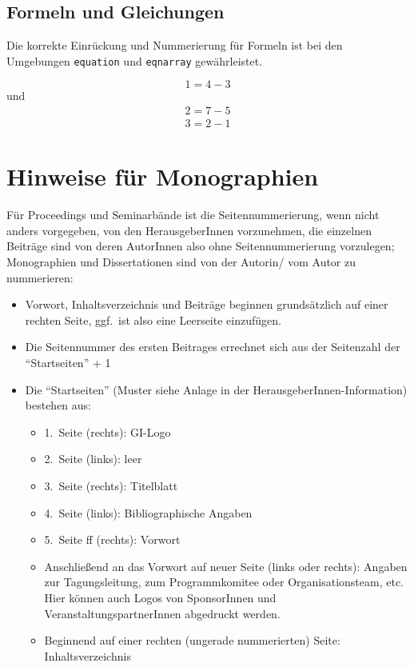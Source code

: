 \documentclass{lni}
\begin{document}
\subsection{Formeln und Gleichungen}

Die korrekte Einrückung und Nummerierung für Formeln ist bei den Umgebungen \texttt{equation} und \texttt{eqnarray} gewährleistet.

\begin{equation}
  1=4-3
\end{equation}
und
\begin{eqnarray}
  2=7-5\\
  3=2-1
\end{eqnarray}

\section{Hinweise für Monographien}
\label{sec:monographien}
Für Proceedings und Seminarbände ist die Seitennummerierung, wenn nicht anders vorgegeben, von den HerausgeberInnen vorzunehmen, die einzelnen Beiträge sind von deren AutorInnen also ohne Seitennummerierung vorzulegen; Monographien und Dissertationen sind von der Autorin/ vom Autor zu nummerieren:
\begin{itemize}
\item Vorwort, Inhaltsverzeichnis und Beiträge beginnen grundsätzlich auf einer rechten Seite, ggf.\ ist also eine Leerseite einzufügen.
\item Die Seitennummer des ersten Beitrages errechnet sich aus der Seitenzahl der \enquote{Startseiten} + 1
\item Die \enquote{Startseiten} (Muster siehe Anlage in der HerausgeberInnen-Information) bestehen aus:
\begin{itemize}
\item 1.\ Seite (rechts): GI-Logo
\item 2.\ Seite (links): leer
\item 3.\ Seite (rechts): Titelblatt
\item 4.\ Seite (links): Bibliographische Angaben
\item 5.\ Seite ff (rechts): Vorwort
\item Anschließend an das Vorwort auf neuer Seite (links oder rechts): Angaben zur Tagungsleitung, zum Programmkomitee oder Organisationsteam, etc. Hier können auch Logos von SponsorInnen und VeranstaltungspartnerInnen abgedruckt werden.
\item Beginnend auf einer rechten (ungerade nummerierten) Seite: Inhaltsverzeichnis
\end{itemize}
\end{itemize}

%


\end{document}
